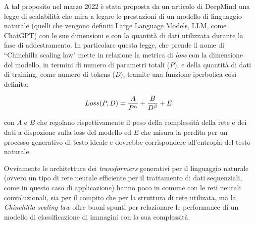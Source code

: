A tal proposito nel marzo 2022 è stata proposta da un articolo di DeepMind \cite{chinchilla} una legge di scalabilità che mira a legare le prestazioni di un modello di linguaggio naturale (quelli che vengono definiti Large Language Models, LLM, come ChatGPT) con le sue dimensioni e con la quantità di dati utilizzata durante la fase di addestramento.
In particolare questa legge, che prende il nome di ``Chinchilla scaling law" mette in relazione la metrica di \textit{loss} con la dimensione del modello, in termini di numero di parametri totali (\textit{P}), e della quantità di dati di training, come numero di tokens (\textit{D}), tramite una funzione iperbolica così definita:

\begin{equation}
\label{eq:chinchilla}
    \centering
    Loss(P,D) = \frac{A}{P^{\alpha}} + \frac{B}{D^{\beta}} + E
\end{equation}

con $A$ e $B$ che regolano rispettivamente il peso della complessità della rete e dei dati a dispozione sulla loss del modello ed $E$ che misura la perdita per un processo generativo di testo ideale e dovrebbe corrispondere all'entropia del testo naturale.


Ovviamente le architetture dei \textit{transformers} generativi per il linguaggio naturale (ovvero un tipo di rete neurale efficiente per il trattamento di dati sequenziali, come in questo caso di applicazione) hanno poco in comune con le reti neurali convoluzionali, sia per il compito che per la struttura di rete utilizata, ma la \textit{Chinchilla scaling law} offre buoni spunti per relazionare le performance di un modello di classificazione di immagini con la sua complessità.

